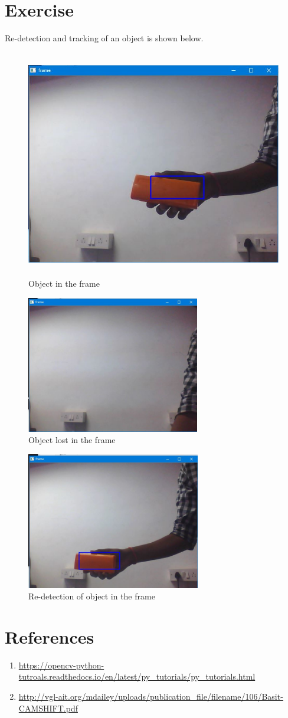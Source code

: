 \documentclass[11pt,a4paper]{article}
\begin{document}
	\section{Exercise}
	Re-detection and tracking of an object  is shown below.
	\begin{figure}[h]
 \includegraphics[width=0.9\linewidth, height=10cm]{Image1.jpg}
   \centering
 \caption{Object in the frame}
  \end{figure}
  \begin{figure}[h]
 \includegraphics[width=0.9\linewidth, height=6cm]{Image2.jpg}
   \centering
 \caption{Object lost in the frame}
  \end{figure}
  \begin{figure}[h]
 \includegraphics[width=0.9\linewidth, height=6cm]{Image3.jpg}
   \centering
 \caption{Re-detection of object in the frame}
  \end{figure}
	\section{References}
	\begin{enumerate}
			\item \url{https://opencv-python-tutroals.readthedocs.io/en/latest/py_tutorials/py_tutorials.html}

\item \url{http://vgl-ait.org/mdailey/uploads/publication_file/filename/106/Basit-CAMSHIFT.pdf}
   \end{enumerate}
	
\end{document}
